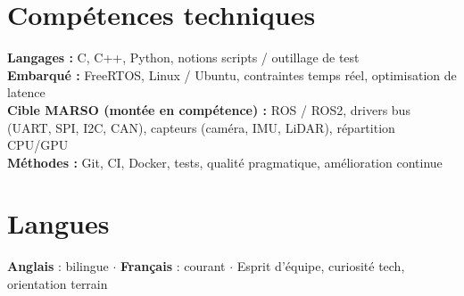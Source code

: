 \documentclass[10pt,a4paper]{article}
\begin{document}
\section{Comp\'etences techniques}
\textbf{Langages :} C, C++, Python, notions scripts / outillage de test\\
\textbf{Embarqu\'e :} FreeRTOS, Linux / Ubuntu, contraintes temps r\'eel, optimisation de latence\\
\textbf{Cible MARSO (mont\'ee en comp\'etence) :} ROS / ROS2, drivers bus (UART, SPI, I2C, CAN), capteurs (cam\'era, IMU, LiDAR), r\'epartition CPU/GPU\\
\textbf{M\'ethodes :} Git, CI, Docker, tests, qualit\'e pragmatique, am\'elioration continue

\section{Langues}
\textbf{Anglais} : bilingue $\cdot$ \textbf{Fran\c{c}ais} : courant $\cdot$ Esprit d'\'equipe, curiosit\'e tech, orientation terrain
\end{document}
